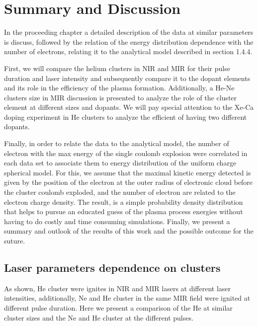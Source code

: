 

\chapter{Summary and Discussion}

In the proceeding chapter a detailed description of the data at similar parameters is discuss, followed by the relation of the energy distribution dependence with the number of electrons, relating it to the analytical model described in section 1.4.4.

First, we will compare the helium clusters in NIR and MIR for their pulse duration and laser intensity and subsequently compare it to the dopant elements and its role in the efficiency of the plasma formation. Additionally, a He-Ne clusters size in MIR discussion is presented to analyze the role of the cluster element at different sizes and dopants. We will pay special attention to the Xe-Ca doping experiment in He clusters to analyze the efficient of having two different dopants.  


Finally, in order to relate the data to the analytical model, the number of electron with the max energy of the single coulomb explosion were correlated in each data set to associate them to energy distribution of the uniform charge spherical model. For this, we assume that the maximal kinetic energy detected is given by the position of the electron at the outer radius of electronic cloud before the cluster coulomb exploded, and the number of electron are related to the electron charge density. The result, is a simple probability density distribution that helps to pursue an educated guess of the plasma process energies without having to do costly and time consuming simulations. Finally, we present a summary and outlook of the results of this work and the possible outcome for the suture.  

\section{Laser parameters dependence on clusters}

As shown, He cluster were ignites in NIR and MIR lasers at different laser intensities, additionally, Ne and He cluster in the same MIR field were ignited at different pulse duration. Here we present a comparison of the He at similar cluster sizes and the Ne and He cluster at the different pulses.


